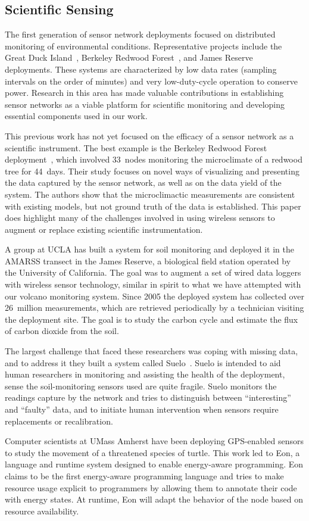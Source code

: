 \subsection{Scientific Sensing}

The first generation of sensor network deployments focused on distributed
monitoring of environmental conditions. Representative projects include the
Great Duck Island~\cite{spm:04habitat,polastre-masters,mainwaring-habitat},
Berkeley Redwood Forest~\cite{berkeley-redwoods}, and James
Reserve~\cite{cerpa-habitat} deployments. These systems are characterized by
low data rates (sampling intervals on the order of minutes) and very
low-duty-cycle operation to conserve power. Research in this area has made
valuable contributions in establishing sensor networks as a viable platform
for scientific monitoring and developing essential components used in our
work. 

This previous work has not yet focused on the efficacy of a sensor network as
a scientific instrument. The best example is the Berkeley Redwood Forest
deployment~\cite{berkeley-redwoods}, which involved 33~nodes monitoring the
microclimate of a redwood tree for 44~days. Their study focuses on novel ways
of visualizing and presenting the data captured by the sensor network, as
well as on the data yield of the system. The authors show that the
microclimactic measurements are consistent with existing models, but not
ground truth of the data is established. This paper does highlight many of
the challenges involved in using wireless sensors to augment or replace
existing scientific instrumentation.

A group at UCLA has built a system for soil monitoring and deployed it in the
AMARSS transect in the James Reserve, a biological field station operated by
the University of California. The goal was to augment a set of wired data
loggers with wireless sensor technology, similar in spirit to what we have
attempted with our volcano monitoring system. Since 2005 the deployed system
has collected over 26~million measurements, which are retrieved periodically
by a technician visiting the deployment site. The goal is to study the carbon
cycle and estimate the flux of carbon dioxide from the soil.

The largest challenge that faced these researchers was coping with missing
data, and to address it they built a system called Suelo~\cite{suelo-sensys09}.
Suelo is intended to aid human researchers in monitoring and assisting the
health of the deployment, sense the soil-monitoring sensors used are quite
fragile. Suelo monitors the readings capture by the network and tries to
distinguish between ``interesting'' and ``faulty'' data, and to initiate human
intervention when sensors require replacements or recalibration.

Computer scientists at UMass Amherst have been deploying GPS-enabled sensors
to study the movement of a threatened species of turtle. This work led to
Eon, a language and runtime system designed to enable energy-aware
programming. Eon claims to be the first energy-aware programming language and
tries to make resource usage explicit to programmers by allowing them to
annotate their code with energy states. At runtime, Eon will adapt the
behavior of the node based on resource availability.
